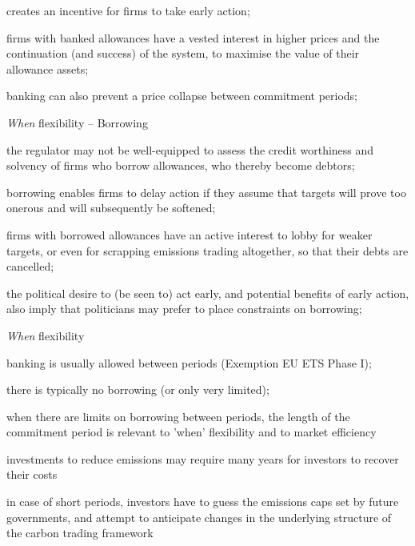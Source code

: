 	creates an incentive for firms to take early action;


	firms with banked allowances have a
vested interest in higher prices and the continuation (and success) of the system, to maximise the value of
their allowance assets;


	banking can also prevent a price collapse between commitment
periods;





{{\it When} flexibility -- Borrowing}






	the regulator may not be well-equipped to assess the credit worthiness and
solvency of firms who borrow allowances, who thereby become debtors;


	borrowing enables firms to delay action if they assume that targets will prove too
onerous and will subsequently be softened;


	firms with borrowed allowances have an active interest to lobby for weaker targets,
or even for scrapping emissions trading altogether, so that their debts are cancelled;


	the political desire to (be seen to) act early, and potential benefits of early action,
also imply that politicians may prefer to place constraints on borrowing;






{{\it When} flexibility}






	banking is usually allowed between periods (Exemption EU ETS Phase I);


	there is typically no borrowing (or only very limited);


	when there are limits on borrowing between periods, the length of the commitment period is relevant to 'when' flexibility
and to market efficiency






	investments to reduce
emissions may require many years for investors to recover their costs


	in case of short periods, investors have to guess the emissions caps set by
future governments, and attempt to anticipate changes in the underlying structure of the
carbon trading framework


